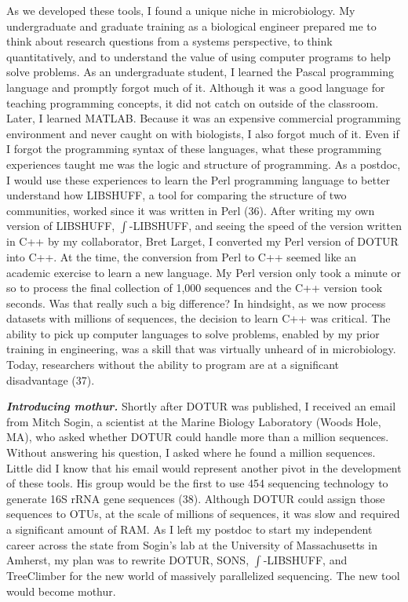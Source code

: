 \documentclass[11pt,]{article}
\begin{document}
As we developed these tools, I found a unique niche in microbiology. My
undergraduate and graduate training as a biological engineer prepared me
to think about research questions from a systems perspective, to think
quantitatively, and to understand the value of using computer programs
to help solve problems. As an undergraduate student, I learned the
Pascal programming language and promptly forgot much of it. Although it
was a good language for teaching programming concepts, it did not catch
on outside of the classroom. Later, I learned MATLAB. Because it was an
expensive commercial programming environment and never caught on with
biologists, I also forgot much of it. Even if I forgot the programming
syntax of these languages, what these programming experiences taught me
was the logic and structure of programming. As a postdoc, I would use
these experiences to learn the Perl programming language to better
understand how LIBSHUFF, a tool for comparing the structure of two
communities, worked since it was written in Perl (36). After writing my
own version of LIBSHUFF, \(\int\)-LIBSHUFF, and seeing the speed of the
version written in C++ by my collaborator, Bret Larget, I converted my
Perl version of DOTUR into C++. At the time, the conversion from Perl to
C++ seemed like an academic exercise to learn a new language. My Perl
version only took a minute or so to process the final collection of
1,000 sequences and the C++ version took seconds. Was that really such a
big difference? In hindsight, as we now process datasets with millions
of sequences, the decision to learn C++ was critical. The ability to
pick up computer languages to solve problems, enabled by my prior
training in engineering, was a skill that was virtually unheard of in
microbiology. Today, researchers without the ability to program are at a
significant disadvantage (37).

\textbf{\emph{Introducing mothur.}} Shortly after DOTUR was published, I
received an email from Mitch Sogin, a scientist at the Marine Biology
Laboratory (Woods Hole, MA), who asked whether DOTUR could handle more
than a million sequences. Without answering his question, I asked where
he found a million sequences. Little did I know that his email would
represent another pivot in the development of these tools. His group
would be the first to use 454 sequencing technology to generate 16S rRNA
gene sequences (38). Although DOTUR could assign those sequences to
OTUs, at the scale of millions of sequences, it was slow and required a
significant amount of RAM. As I left my postdoc to start my independent
career across the state from Sogin's lab at the University of
Massachusetts in Amherst, my plan was to rewrite DOTUR, SONS,
\(\int\)-LIBSHUFF, and TreeClimber for the new world of massively
parallelized sequencing. The new tool would become mothur.
\end{document}
